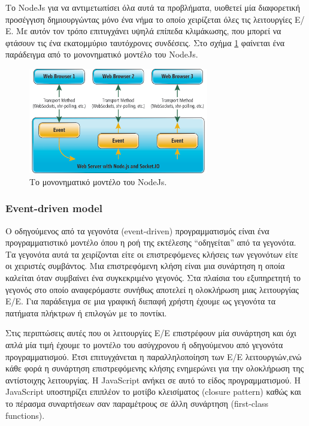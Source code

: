 		 
		 Το NodeJs για να αντιμετωπίσει όλα αυτά τα προβλήματα, υιοθετεί μία διαφορετική προσέγγιση δημιουργώντας μόνο ένα νήμα το οποίο χειρίζεται όλες τις λειτουργίες Ε/Ε. Με αυτόν τον τρόπο επιτυγχάνει υψηλά επίπεδα κλιμάκωσης, που μπορεί να φτάσουν τις ένα εκατομμύριο ταυτόχρονες συνδέσεις. Στο σχήμα \ref{fig:single} φαίνεται ένα παράδειγμα από το μονονηματικό μοντέλο του NodeJs.
		 
			 \begin{figure}[h]
	    \centering
	    \includegraphics[width=0.7\textwidth]{single.png}
	    \caption{ Το μονονηματικό μοντέλο του NodeJs.}
	    \label{fig:single}
	\end{figure} 

\subsubsection{Event-driven model}		 

		O οδηγούμενος από τα γεγονότα (event-driven) προγραμματισμός είναι ένα προγραμματιστικό μοντέλο όπου η ροή της εκτέλεσης “οδηγείται” από τα γεγονότα. Τα γεγονότα αυτά τα χειρίζονται είτε οι επιστρεφόμενες κλήσεις των γεγονότων είτε οι χειριστές συμβάντος. Μια επιστρεφόμενη κλήση είναι μια συνάρτηση η οποία καλείται όταν συμβαίνει ένα συγκεκριμένο γεγονός. Στα πλαίσια του εξυπηρετητή το γεγονός στο οποίο αναφερόμαστε συνήθως αποτελεί η ολοκλήρωση μιας λειτουργίας Ε/Ε. Για παράδειγμα σε μια γραφική διεπαφή χρήστη έχουμε ως γεγονότα τα πατήματα πλήκτρων ή επιλογών με το ποντίκι.
		
		Στις περιπτώσεις αυτές που οι λειτουργίες Ε/Ε επιστρέφουν μία συνάρτηση και όχι απλά μία τιμή έχουμε το μοντέλο του ασύγχρονου ή οδηγούμενου από γεγονότα προγραμματισμού. Έτσι επιτυγχάνεται η παραλληλοποίηση των Ε/Ε λειτουργιών,ενώ κάθε φορά η συνάρτηση επιστρεφόμενης κλήσης ενημερώνει για την ολοκλήρωση της αντίστοιχης λειτουργίας. Η JavaScript ανήκει σε αυτό το είδος προγραμματισμού. Η JavaScript υποστηρίζει επιπλέον το μοτίβο κλεισίματος (closure pattern) καθώς και το πέρασμα συναρτήσεων σαν παραμέτρους σε άλλη συνάρτηση (first-class functions).
		

